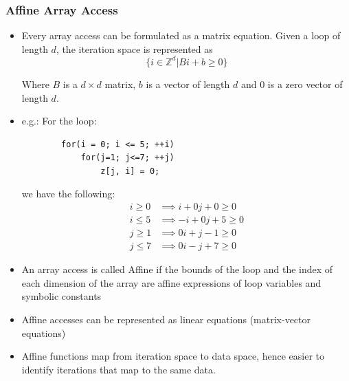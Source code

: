 \documentclass{article}
\begin{document}
\subsubsection{Affine Array Access}
\begin{itemize}
    \item Every array access can be formulated as a matrix equation. Given a loop of length $d$, the iteration space is represented as 
    \begin{equation*}
        \{ i \in \mathbb{Z}^d | Bi + b \ge 0 \}
    \end{equation*}
    
    Where $B$ is a $d \times d$ matrix, $b$ is a vector of length $d$ and 0 is a zero vector of length $d$. 
    
    \item e.g.: For the loop:
    \begin{verbatim}
        for(i = 0; i <= 5; ++i)
            for(j=1; j<=7; ++j)
                z[j, i] = 0;
    \end{verbatim}
    
    we have the following:
    \begin{align*}
        i \ge 0 &\implies i + 0j + 0\ge 0 \\
        i \le 5 &\implies -i + 0j +5 \ge 0 \\
        j \ge 1 &\implies 0i + j - 1 \ge 0 \\
        j \le 7 &\implies 0i -j + 7 \ge 0
    \end{align*}
    
    \item An array access is called Affine if the bounds of the loop and the index of each dimension of the array are affine expressions of loop variables and symbolic constants
    
    \item Affine accesses can be represented as linear equations (matrix-vector equations)
    
    \item Affine functions map from iteration space to data space, hence easier to identify iterations that map to the same data. 
\end{itemize}
\end{document}
